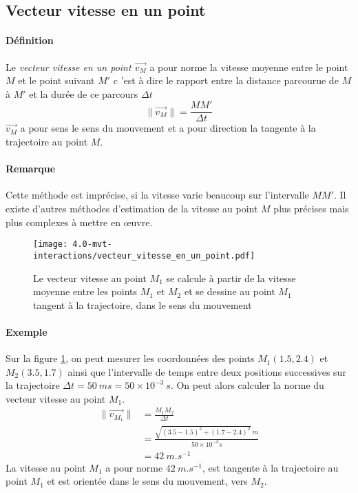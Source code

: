 \subsection{Vecteur vitesse en un point}
\paragraph{Définition} Le \textit{vecteur vitesse en un point $\overrightarrow{v_M}$} a pour norme la vitesse moyenne entre le point $M$ et le point suivant $M'$ c 'est à dire le rapport entre la distance parcourue de $M$ à $M'$ et la durée de ce parcours $\Delta  t$ 
$$ \lVert \overrightarrow{v_M} \rVert = \frac{MM'}{\Delta t} $$ 
$\overrightarrow{v_M}$ a pour sens le sens du mouvement et a pour direction la tangente à la trajectoire au point $M$.

\paragraph{Remarque} Cette méthode est imprécise, si la vitesse varie beaucoup sur l'intervalle $MM'$. Il existe d'autres méthodes d'estimation de la vitesse au point $M$ plus précises mais plus complexes à mettre en œuvre.
\begin{figure}[h!]
  \begin{center}
      \texttt{[image: 4.0-mvt-interactions/vecteur\_vitesse\_en\_un\_point.pdf]}
  \end{center}
  \caption{Le vecteur vitesse au point $M_1$ se calcule à partir de la vitesse moyenne entre les points $M_1$ et $M_2$ et se dessine au point $M_1$ tangent à la trajectoire, dans le sens du mouvement}
  \label{fig:vec_vitesse_en_un_point}
\end{figure}
\paragraph{Exemple} Sur la figure \ref{fig:vec_vitesse_en_un_point}, on peut mesurer les coordonnées des points $M_1(1.5,2.4)$ et $M_2(3.5,1.7)$ ainsi que l'intervalle de temps entre deux positions successives sur la trajectoire $\Delta t = 50~ms = 50 \times 10^{-3}~s$. On peut alors calculer la norme du vecteur vitesse au point $M_1$.
\begin{equation*}
  \begin{aligned}
   	\lVert \overrightarrow{v_{M_1}} \rVert & = \frac{M_1M_2}{\Delta t} \\
	      & = \frac{ \sqrt{(3.5-1.5)^2 + (1.7 - 2.4)^2}~m}{50 \times 10^{-3} s  } \\
	      & =42~m.s^{-1}
  \end{aligned} 
\end{equation*}
La vitesse au point $M_1$ a pour norme $42~m.s^{-1}$, est tangente à la trajectoire au point $M_1$ et est orientée dans le sens du mouvement, vers $M_2$.



